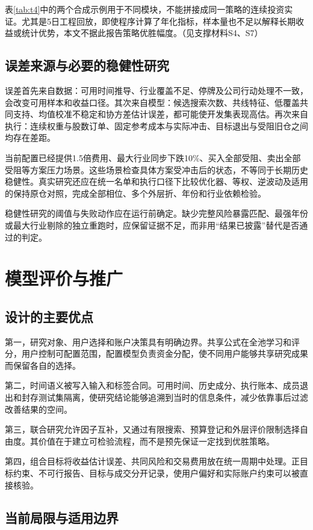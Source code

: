 \documentclass[UTF8,12pt,a4paper,fontset=none]{ctexart}
\begin{document}
表\ref{tab:t4}中的两个合成示例用于不同模块，不能拼接成同一策略的连续投资实证。尤其是5日工程回放，即使程序计算了年化指标，样本量也不足以解释长期收益或统计优势，本文不据此报告策略优胜幅度。（见支撑材料S4、S7）


\subsection{误差来源与必要的稳健性研究}

误差首先来自数据：可用时间推导、行业覆盖不足、停牌及公司行动处理不一致，会改变可用样本和收益口径。其次来自模型：候选搜索次数、共线特征、低覆盖共同支持、均值校准不稳定和协方差估计误差，都可能使开发集表现高估。再次来自执行：连续权重与股数订单、固定参考成本与实际冲击、目标退出与受阻旧仓之间均存在差距。


当前配置已经提供1.5倍费用、最大行业同步下跌10\%、买入全部受阻、卖出全部受阻等方案压力场景。这些场景检查具体方案受冲击后的状态，不等同于长期历史稳健性。真实研究还应在统一名单和执行口径下比较优化器、等权、逆波动及适用的保持原仓对照，完成全部相位、多个外层折、年份和行业依赖检验。


稳健性研究的阈值与失败动作应在运行前确定。缺少完整风险暴露匹配、最强年份或最大行业剔除的独立重跑时，应保留证据不足，而非用“结果已披露”替代是否通过的判定。


\section{模型评价与推广}

\subsection{设计的主要优点}

第一，研究对象、用户选择和账户决策具有明确边界。共享公式在全池学习和评分，用户控制可配置范围，配置模型负责资金分配，使不同用户能够共享研究成果而保留各自的选择。


第二，时间语义被写入输入和标签合同。可用时间、历史成分、执行账本、成员退出和封存测试集隔离，使研究结论能够追溯到当时的信息条件，减少依靠事后过滤改善结果的空间。


第三，联合研究允许因子互补，又通过有限搜索、预算登记和外层评价限制选择自由度。其价值在于建立可检验流程，而不是预先保证一定找到优胜策略。


第四，组合目标将收益估计误差、共同风险和交易费用放在统一周期中处理。正目标约束、不可行报告、目标与成交分开记录，使用户偏好和实际账户约束可以被直接核验。


\subsection{当前局限与适用边界}
\end{document}
